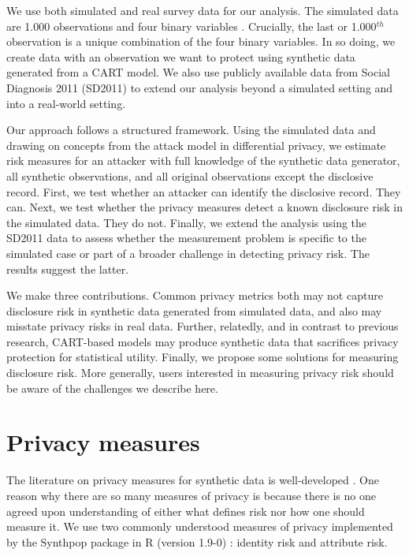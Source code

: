 \documentclass[runningheads]{llncs}
\begin{document}
We use both simulated and real survey data for our analysis. The simulated data are 1.000 observations and four binary variables \cite{reiter2014bayesian}. Crucially, the last or 1.000$^{th}$ observation is a unique combination of the four binary variables.  In so doing, we create data with an observation we want to protect using synthetic data generated from a CART model.  We also use publicly available data from Social Diagnosis 2011 (SD2011) to extend our analysis beyond a simulated setting and into a real-world setting.

Our approach follows a structured framework. Using the simulated data and drawing on concepts from the attack model in differential privacy, we estimate risk measures for an attacker with full knowledge of the synthetic data generator, all synthetic observations, and all original observations except the disclosive record.  First, we test whether an attacker can identify the disclosive record.  They can.  Next, we test whether the privacy measures detect a known disclosure risk in the simulated data. They do not.  Finally, we extend the analysis using the SD2011 data to assess whether the measurement problem is specific to the simulated case or part of a broader challenge in detecting privacy risk. The results suggest the latter.

We make three contributions.  Common privacy metrics both may not capture disclosure risk in synthetic data generated from simulated data, and also may misstate privacy risks in real data.  Further, relatedly, and in contrast to previous research, CART-based models may produce synthetic data that sacrifices privacy protection for statistical utility.  Finally, we propose some solutions for measuring disclosure risk.  More generally, users interested in measuring privacy risk should be aware of the challenges we describe here.

\section{Privacy measures}

The literature on privacy measures for synthetic data is well-developed \cite{wagner2018technical}.  One reason why there are so many measures of privacy is because there is no one agreed upon understanding of either what defines risk nor how one should measure it.  We use two commonly understood measures of privacy implemented by the Synthpop package in R (version 1.9-0) \cite{raab2024practical}: identity risk and attribute risk.  
\end{document}
